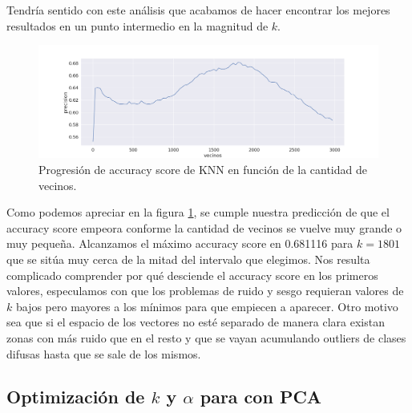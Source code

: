 Tendría sentido con este análisis que acabamos de hacer encontrar los mejores resultados en un punto intermedio en la magnitud de $k$.

\begin{figure}[h]
\includegraphics[width=\textwidth]{./img/knn.png}
\centering
\caption{Progresión de accuracy score de KNN en función de la cantidad de vecinos.\label{fig:knn_acc}}

\end{figure}

Como podemos apreciar en la figura \ref{fig:knn_acc}, se cumple nuestra predicción de que el accuracy score empeora conforme la cantidad de vecinos se vuelve muy grande o muy pequeña. Alcanzamos el máximo accuracy score en 0.681116 para $k=1801$ que se sitúa muy cerca de la mitad del intervalo que elegimos. Nos resulta complicado comprender por qué desciende el accuracy score en los primeros valores, especulamos con que los problemas de ruido y sesgo requieran valores de $k$ bajos pero mayores a los mínimos para que empiecen a aparecer. Otro motivo sea que si el espacio de los vectores no esté separado de manera clara existan zonas con más ruido que en el resto y que se vayan acumulando outliers de clases difusas hasta que se sale de los mismos.

\subsection{Optimización de $k$ y $\alpha$ para \knn{} con PCA}%
\label{sub:alpha_k_knn_pca}

